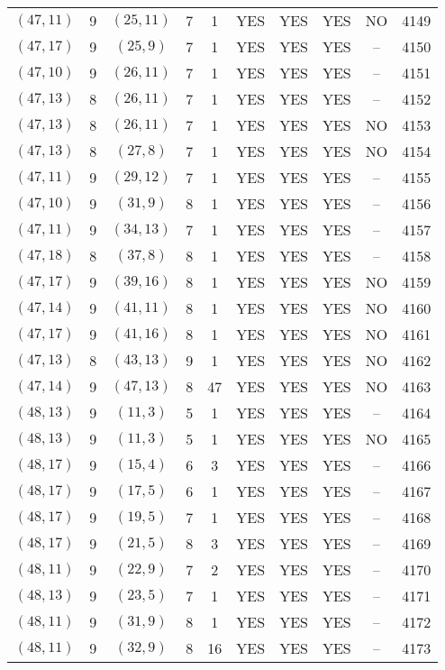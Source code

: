 \begin{longtable}{|c|c|c|c|c|c|c|c|c|c|}
$(47, 11)$ & 9 & $(25, 11)$ & 7 & 1 & YES & YES & YES & NO & 4149\\
$(47, 17)$ & 9 & $(25, 9)$ & 7 & 1 & YES & YES & YES & -- & 4150\\
$(47, 10)$ & 9 & $(26, 11)$ & 7 & 1 & YES & YES & YES & -- & 4151\\
$(47, 13)$ & 8 & $(26, 11)$ & 7 & 1 & YES & YES & YES & -- & 4152\\
$(47, 13)$ & 8 & $(26, 11)$ & 7 & 1 & YES & YES & YES & NO & 4153\\
$(47, 13)$ & 8 & $(27, 8)$ & 7 & 1 & YES & YES & YES & NO & 4154\\
$(47, 11)$ & 9 & $(29, 12)$ & 7 & 1 & YES & YES & YES & -- & 4155\\
$(47, 10)$ & 9 & $(31, 9)$ & 8 & 1 & YES & YES & YES & -- & 4156\\
$(47, 11)$ & 9 & $(34, 13)$ & 7 & 1 & YES & YES & YES & -- & 4157\\
$(47, 18)$ & 8 & $(37, 8)$ & 8 & 1 & YES & YES & YES & -- & 4158\\
$(47, 17)$ & 9 & $(39, 16)$ & 8 & 1 & YES & YES & YES & NO & 4159\\
$(47, 14)$ & 9 & $(41, 11)$ & 8 & 1 & YES & YES & YES & NO & 4160\\
$(47, 17)$ & 9 & $(41, 16)$ & 8 & 1 & YES & YES & YES & NO & 4161\\
$(47, 13)$ & 8 & $(43, 13)$ & 9 & 1 & YES & YES & YES & NO & 4162\\
$(47, 14)$ & 9 & $(47, 13)$ & 8 & 47 & YES & YES & YES & NO & 4163\\
$(48, 13)$ & 9 & $(11, 3)$ & 5 & 1 & YES & YES & YES & -- & 4164\\
$(48, 13)$ & 9 & $(11, 3)$ & 5 & 1 & YES & YES & YES & NO & 4165\\
$(48, 17)$ & 9 & $(15, 4)$ & 6 & 3 & YES & YES & YES & -- & 4166\\
$(48, 17)$ & 9 & $(17, 5)$ & 6 & 1 & YES & YES & YES & -- & 4167\\
$(48, 17)$ & 9 & $(19, 5)$ & 7 & 1 & YES & YES & YES & -- & 4168\\
$(48, 17)$ & 9 & $(21, 5)$ & 8 & 3 & YES & YES & YES & -- & 4169\\
$(48, 11)$ & 9 & $(22, 9)$ & 7 & 2 & YES & YES & YES & -- & 4170\\
$(48, 13)$ & 9 & $(23, 5)$ & 7 & 1 & YES & YES & YES & -- & 4171\\
$(48, 11)$ & 9 & $(31, 9)$ & 8 & 1 & YES & YES & YES & -- & 4172\\
$(48, 11)$ & 9 & $(32, 9)$ & 8 & 16 & YES & YES & YES & -- & 4173\\

\end{longtable}
